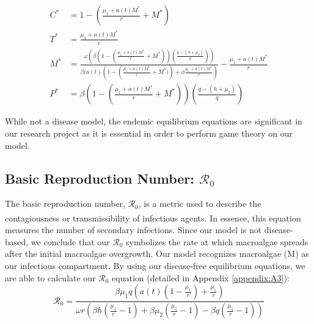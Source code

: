 \documentclass[12pt]{article}
\begin{document}
\begin{align*}
        C^{*} &= 1- \left(\frac{\mu_{1} + a(t)M^{*}}{r} + M^{*} \right)  
        \label{eq:C*} \\
        T^{*} &= \frac{\mu_{1} + a(t)M^{*}}{r} 
        \label{eq:T*} \\
        M^{*} &= \frac{\omega (\beta \left(1- \left(\frac{\mu_{1} + a(t)M^{*}}{r} + M^{*} \right) \right) \left(\frac{q-(h+\mu_{2})}{q} \right))}{\beta(a(t)(1- \left(\frac{\mu_{1} + a(t)M^{*}}{r} + M^{*}) \right)+\phi \frac{\mu_{1} + a(t)M^{*}}{r})} - \frac{\mu_{1} + a(t)M^{*}}{r} 
        \label{eq:M*} \\
        P^{*} &= \beta \left(1- \left(\frac{\mu_{1} + a(t)M^{*}}{r} + M^{*} \right) \right) \left(\frac{q-(h+\mu_{2})}{q} \right) 
        \label{eq:P*}
\end{align*}

While not a disease model, the endemic equilibrium equations are significant in our research project as it is essential in order to perform game theory on our model. 

\subsection{Basic Reproduction Number: $\mathscr{R}_{0}$}
The basic reproduction number, $\mathscr{R}_{0}$, is a metric used to describe the contagiousness or transmissibility of infectious agents\textsuperscript{\cite{delamater_street_leslie_yang_jacobsen_2019}}. In essence, this equation measures the number of secondary infections. Since our model is not disease-based, we conclude that our $\mathscr{R}_{0}$ symbolizes the rate at which macroalgae spreads after the initial macroalgae overgrowth. Our model recognizes macroalgae (M) as our infectious compartment. By using our disease-free equilibrium equations, we are able to calculate our $\mathscr{R}_{0}$ equation (detailed in Appendix \ref{appendix:A3}): 
\begin{equation}
    \displaystyle {\mathscr{R}}_{0} = \frac{\beta \mu_{1}q(a(t)(1 - \frac{\mu_{1}}{r}) + \frac{\mu_{1}}{r})}{\omega r (\beta h (\frac{\mu_{1}}{r}-1) + \beta \mu_{2} (\frac{\mu_{1}}{r}-1) - \beta q(\frac{\mu_{1}}{r}-1))}
    \label{eq:R0}
\end{equation}
\end{document}
